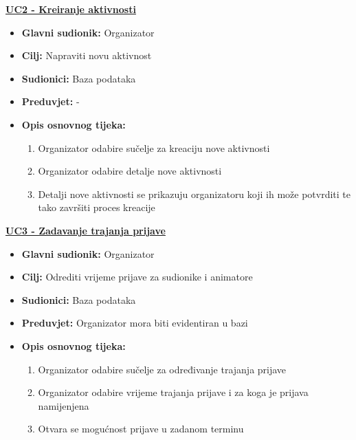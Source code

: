 \noindent \underline{\textbf{UC2 - Kreiranje aktivnosti}}

\begin{itemize}
	\item \textbf{Glavni sudionik:} Organizator
	\item \textbf{Cilj:} Napraviti novu aktivnost
	\item \textbf{Sudionici:} Baza podataka
	\item \textbf{Preduvjet:} -
	\item \textbf{Opis osnovnog tijeka:} 
	\begin{enumerate}	
		\item Organizator odabire sučelje za kreaciju nove aktivnosti
		\item Organizator odabire detalje nove aktivnosti
		\item Detalji nove aktivnosti se prikazuju organizatoru koji ih može potvrditi te tako završiti proces kreacije
	\end{enumerate}
	
\end{itemize}

\noindent \underline{\textbf{UC3 - Zadavanje trajanja prijave}}
\begin{itemize}
	\item \textbf{Glavni sudionik:} Organizator
	\item \textbf{Cilj:} Odrediti vrijeme prijave za sudionike i animatore
	\item \textbf{Sudionici:} Baza podataka
	\item \textbf{Preduvjet:} Organizator mora biti evidentiran u bazi
	\item \textbf{Opis osnovnog tijeka:} 
	\begin{enumerate}	
		\item Organizator odabire sučelje za određivanje trajanja prijave
		\item Organizator odabire vrijeme trajanja prijave i za koga je prijava namijenjena
		\item Otvara se mogućnost prijave u zadanom terminu\\
	\end{enumerate}
	
\end{itemize}

